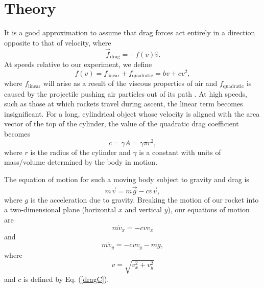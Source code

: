 \documentclass[aps,pra,twocolumn]{revtex4-1}
\begin{document}
\section{\label{section 2} Theory}
It is a good approximation to assume that drag forces act entirely in a direction opposite to that of velocity, where
\begin{equation}
\vec{f}_\text{drag} = - f(v) \hat{v}.
\end{equation}
At speeds relative to our experiment, we define
\begin{equation}
f(v) = f_\text{linear} + f_\text{quadratic} = b v + c v^2 ,
\end{equation}
where $f_\text{linear}$ will arise as a result of the viscous properties of air and $f_\text{quadratic}$ is caused by the projectile pushing air particles out of its path \cite{taylor2005}.  At high speeds, such as those at which rockets travel during ascent, the linear term becomes insignificant.  For a long, cylindrical object whose velocity is aligned with the area vector of the top of the cylinder, the value of the quadratic drag coefficient becomes
\begin{equation}
c = \gamma A = \gamma \pi r^2,
\end{equation}
where $r$ is the radius of the cylinder and $\gamma$ is a constant with units of mass/volume determined by the body in motion.

The equation of motion for such a moving body subject to gravity and drag is \cite{taylor2005}
\begin{equation}
m \dot{\vec{v}} = m \vec{g} - c v \vec{v}, \label{dragC}
\end{equation}
where $g$ is the acceleration due to gravity.  Breaking the motion of our rocket into a two-dimensional plane (horizontal $x$ and vertical $y$), our equations of motion are
\begin{equation}
m \dot{v}_x  = -c v v_x \label{xafter}
\end{equation}
and
\begin{equation}
m \dot{v}_y  = -c v v_y - mg, \label{yafter}
\end{equation}
where
\begin{equation}
v = \sqrt{v_x^2 + v_y^2} \label{vValue}
\end{equation}
and $c$ is defined by Eq. (\ref{dragC}).
\end{document}
